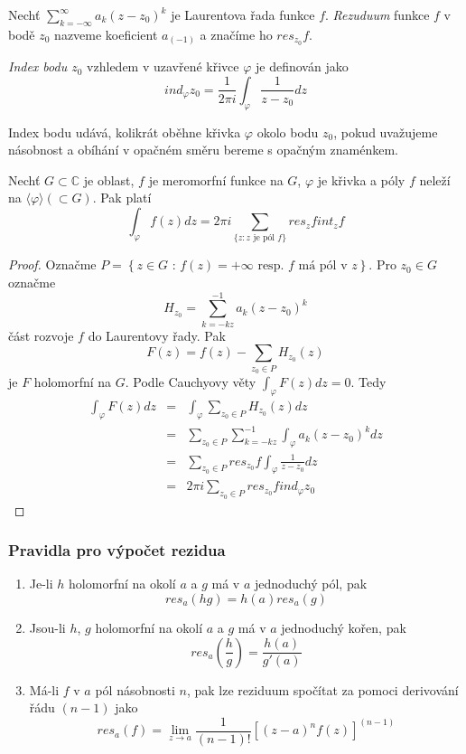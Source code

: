 \begin{definice}
Nechť $\sum_{k =- \infty}^\infty a_k ( z-z_0)^k$ je Laurentova řada funkce $f$. \emph{Rezuduum} funkce $f$ v bodě $z_0$ nazveme koeficient $a_{(-1)}$ a značíme ho $res_{z_0} f$.
\end{definice}

\begin{definice}
\emph{Index bodu $z_0$} vzhledem v uzavřené křivce $\varphi$ je definován jako
$$ind_\varphi z_0 = \frac{1}{2 \pi i} \int_\varphi \frac{1}{z-z_0}dz$$
\end{definice}

Index bodu udává, kolikrát oběhne křivka $\varphi$ okolo bodu $z_0$, pokud uvažujeme násobnost a obíhání v opačném směru bereme s opačným znaménkem.

\begin{vetat}
Nechť $G \subset \mathbb{C}$ je oblast, $f$ je meromorfní funkce na $G$, $\varphi$ je křivka a póly $f$ neleží na $\langle \varphi \rangle (\subset G)$. Pak platí
$$\int_\varphi f(z) dz = 2 \pi i \sum_{\{z: z \textrm{ je pól } f\}} res_z f int_z f$$
\end{vetat}

\begin{proof}
Označme $P = \left\{ z \in G \textrm{ : } f(z)=+\infty \textrm{ resp. $f$ má pól v $z$} \right\}$. 
Pro $z_0 \in G$ označme 
$$H_{z_0} = \sum_{k = -kz}^{-1} a_k (z-z_0)^k$$ 
část rozvoje $f$ do Laurentovy řady.
Pak $$F(z) = f(z) - \sum_{z_0 \in P} H_{z_0}(z)$$ je $F$ holomorfní na $G$.
Podle Cauchyovy věty $\int_\varphi F(z) dz = 0$. Tedy
\begin{eqnarray*}
\int_\varphi F(z) dz & = & \int_\varphi \sum_{z_0 \in P} H_{z_0}(z) dz \\
& = & \sum_{z_0 \in P} \sum_{k=-kz}^{-1} \int_\varphi a_k (z-z_0)^k dz \\
& = & \sum_{z_0 \in P} res_{z_0} f \int_\varphi \frac{1}{z-z_0} dz \\
& = & 2 \pi i \sum_{z_0 \in P} res_{z_0} f ind_\varphi z_0 
\end{eqnarray*}
\end{proof}

\subsubsection*{Pravidla pro výpočet rezidua}

\begin{enumerate}
\item Je-li $h$ holomorfní na okolí $a$ a $g$ má v $a$ jednoduchý pól, pak
$$res_a(hg) = h(a) res_a (g)$$
\item Jsou-li $h$, $g$ holomorfní na okolí $a$ a $g$ má v $a$ jednoduchý kořen, pak 
$$res_a \left( \frac{h}{g} \right) = \frac{h(a)}{g \prime (a)}$$
\item Má-li $f$ v $a$ pól násobnosti $n$, pak lze reziduum spočítat za pomoci derivování řádu $(n-1)$ jako
$$res_a(f) = \lim_{z \rightarrow a} \frac{1}{(n-1)!} \left[ (z-a)^n f(z) \right]^{(n-1)}$$
\end{enumerate}

